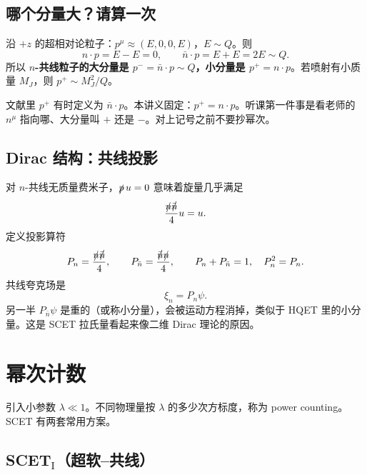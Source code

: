 \documentclass[11pt,a4paper]{article}
\theoremstyle{definition}
\theoremstyle{plain}
\theoremstyle{remark}
\newcommand{\slashn}{\slashed{n}}
\newcommand{\slashnb}{\slashed{\bar n}}
\begin{document}
\subsection{哪个分量大？请算一次}

沿 $+z$ 的超相对论粒子：$p^\mu\approx(E,0,0,E)$，$E\sim Q$。则
\begin{equation}
  n\cdot p=E-E=0,\qquad \bar n\cdot p=E+E=2E\sim Q.
\end{equation}
所以 \textbf{$n$-共线粒子的大分量是 $p^-=\bar n\cdot p\sim Q$，小分量是 $p^+=n\cdot p$}。若喷射有小质量 $M_J$，则 $p^+\sim M_J^2/Q$。

\begin{warnbox}
文献里 $p^+$ 有时定义为 $\bar n\cdot p$。本讲义固定：$p^+=n\cdot p$。听课第一件事是看老师的 $n^\mu$ 指向哪、大分量叫 $+$ 还是 $-$。对上记号之前不要抄幂次。
\end{warnbox}

\subsection{Dirac 结构：共线投影}

对 $n$-共线无质量费米子，$\slashed{p}\,u=0$ 意味着旋量几乎满足
\begin{equation}
  \frac{\slashn\slashnb}{4}u=u.
\end{equation}
定义投影算符
\begin{equation}
\label{eq:proj}
  P_n=\frac{\slashn\slashnb}{4},\qquad P_{\bar n}=\frac{\slashnb\slashn}{4},\qquad
  P_n+P_{\bar n}=1,\quad P_n^2=P_n.
\end{equation}
共线夸克场是
\begin{equation}
  \xi_n=P_n\psi.
\end{equation}
另一半 $P_{\bar n}\psi$ 是重的（或称小分量），会被运动方程消掉，类似于 HQET 里的小分量。这是 SCET 拉氏量看起来像二维 Dirac 理论的原因。

\section{幂次计数}
\label{sec:power}

引入小参数 $\lambda\ll 1$。不同物理量按 $\lambda$ 的多少次方标度，称为 power counting。SCET 有两套常用方案。

\subsection{SCET$_{\mathrm I}$（超软--共线）}
\end{document}
